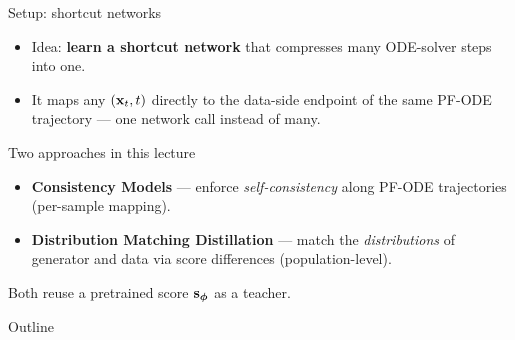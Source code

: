 \documentclass{beamer}
\begin{document}
\begin{frame}{Setup: shortcut networks}
	\begin{itemize}
		\item Idea: \textbf{learn a shortcut network} that compresses many ODE-solver steps into one.
		\item It maps any $(\mathbf{x}_t, t)$ directly to the data-side endpoint of the same PF-ODE trajectory --- one network call instead of many.
	\end{itemize}
	\eqpause
	\begin{block}{Two approaches in this lecture}
		\begin{itemize}
			\item \textbf{Consistency Models} --- enforce \emph{self-consistency} along PF-ODE trajectories (per-sample mapping).
			\item \textbf{Distribution Matching Distillation} --- match the \emph{distributions} of generator and data via score differences (population-level).
		\end{itemize}
	\end{block}
	\eqpause
	Both reuse a pretrained score $\mathbf{s}_{\boldsymbol{\phi}}$ as a teacher.
\end{frame}
\begin{frame}{Outline}
	\tableofcontents
\end{frame}
\end{document}
